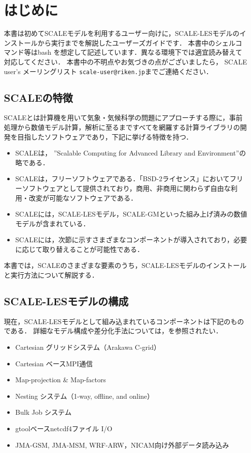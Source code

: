 \section{はじめに}

本書は初めてSCALEモデルを利用するユーザー向けに，SCALE-LESモデルのインストールから実行までを解説したユーザーズガイドです．
本書中のシェルコマンド等はbash を想定して記述しています．異なる環境下では適宜読み替えて対応してください．
本書中の不明点やお気づきの点がございましたら，
SCALE user's メーリングリスト \verb|scale-user@riken.jp|までご連絡ください．

\subsection{SCALEの特徴}
SCALEとは計算機を用いて気象・気候科学の問題にアプローチする際に，事前処理から数値モデル計算，解析に至るまですべてを網羅する計算ライブラリの開発を目指したソフトウェアであり，下記に挙げる特徴を持つ．
\begin{itemize}
\item SCALEは， ''Scalable Computing for Advanced Library and Environment''の略である．
\item SCALEは，フリーソフトウェアである．「BSD-2ライセンス」においてフリーソフトウェアとして提供されており，商用、非商用に関わらず自由な利用・改変が可能なソフトウェアである．
\item SCALEには，SCALE-LESモデル，SCALE-GMといった組み上げ済みの数値モデルが含まれている．
\item SCALEには，次節に示すさまざまなコンポーネントが導入されており，必要に応じて取り替えることが可能性である．
\end{itemize}

本書では，SCALEのさまざまな要素のうち，SCALE-LESモデルのインストールと実行方法について解説する．

\subsection{SCALE-LESモデルの構成}
現在，SCALE-LESモデルとして組み込まれているコンポーネントは下記のものである．
詳細なモデル構成や差分化手法については，\cite{scale_2015}を参照されたい．\\


\begin{itemize}
 \item Cartesian グリッドシステム（Arakawa C-grid）
 \item Cartesian ベースMPI通信
 \item Map-projection \& Map-factors
 \item Nesting システム（1-way, offline, and online）
 \item Bulk Job システム
 \item gtoolベースnetcdf4ファイル I/O
 \item JMA-GSM, JMA-MSM, WRF-ARW，NICAM向け外部データ読み込み
\end{itemize}

